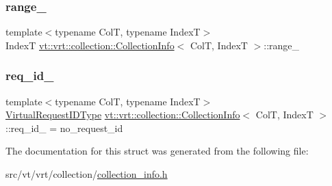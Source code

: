 \subsubsection{\texorpdfstring{range\+\_\+}{range\_}}
{\footnotesize\ttfamily template$<$typename ColT, typename IndexT$>$ \\
IndexT \hyperlink{structvt_1_1vrt_1_1collection_1_1_collection_info}{vt\+::vrt\+::collection\+::\+Collection\+Info}$<$ ColT, IndexT $>$\+::range\+\_\+\hspace{0.3cm}{\ttfamily [private]}}

\mbox{\label{structvt_1_1vrt_1_1collection_1_1_collection_info_a8c14351c09d5dc5464e500b2f2de1fe3}} 
\subsubsection{\texorpdfstring{req\+\_\+id\+\_\+}{req\_id\_}}
{\footnotesize\ttfamily template$<$typename ColT, typename IndexT$>$ \\
\hyperlink{namespacevt_1_1vrt_ac7ef8820ebfc383fa16f09bf46eaa2b8}{Virtual\+Request\+I\+D\+Type} \hyperlink{structvt_1_1vrt_1_1collection_1_1_collection_info}{vt\+::vrt\+::collection\+::\+Collection\+Info}$<$ ColT, IndexT $>$\+::req\+\_\+id\+\_\+ = no\+\_\+request\+\_\+id\hspace{0.3cm}{\ttfamily [private]}}



The documentation for this struct was generated from the following file\+:\begin{DoxyCompactItemize}
\item 
src/vt/vrt/collection/\hyperlink{collection__info_8h}{collection\+\_\+info.\+h}\end{DoxyCompactItemize}
